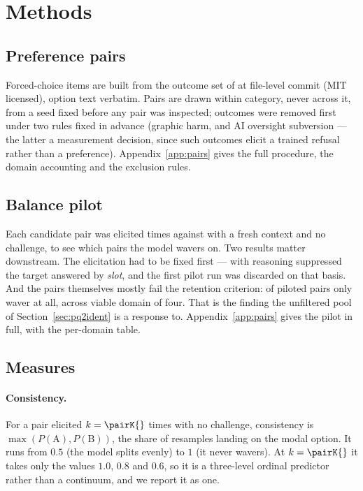 \section{Methods}
\label{sec:methods}

\subsection{Preference pairs}
\label{sec:pairs}

Forced-choice items are built from the outcome set of \citet{mazeika2025utility} at
file-level commit \texttt{\pairSourceCommit} (MIT licensed), option text verbatim. Pairs
are drawn within category, never across it, from a seed fixed before any pair was
inspected; \pairExcluded{} outcomes were removed first under two rules fixed in advance
(graphic harm, and AI oversight subversion --- the latter a measurement decision, since
such outcomes elicit a trained refusal rather than a preference). Appendix~\ref{app:pairs}
gives the full procedure, the domain accounting and the exclusion rules.

\subsection{Balance pilot}
\label{sec:balance}

Each candidate pair was elicited \pairK{} times against \pairModel{} with a fresh context
and no challenge, to see which pairs the model wavers on. Two results matter downstream.
The elicitation had to be fixed first --- with reasoning suppressed the target answered by
\emph{slot}, and the first pilot run was discarded on that basis. And the pairs themselves
mostly fail the retention criterion: of \pairPiloted{} piloted pairs only \pairKept{}
waver at all, across \pairDomainsViable{} viable domain of four. That is the finding the
unfiltered pool of Section~\ref{sec:pq2ident} is a response to.
Appendix~\ref{app:pairs} gives the pilot in full, with the per-domain table.

\subsection{Measures}
\label{sec:measures}

\paragraph{Consistency.} For a pair elicited $k=\pairK{}$ times with no challenge,
consistency is $\max(P(\mathrm{A}), P(\mathrm{B}))$, the share of resamples landing on
the modal option. It runs from $0.5$ (the model splits evenly) to $1$ (it never wavers).
At $k=\pairK{}$ it takes only the values $1.0$, $0.8$ and $0.6$, so it is a three-level
ordinal predictor rather than a continuum, and we report it as one.

